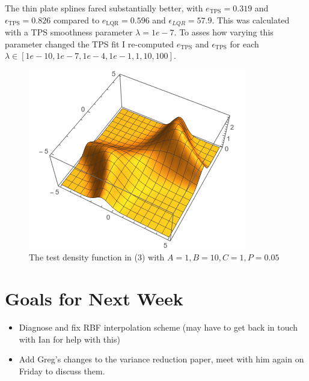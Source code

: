 \documentclass[12pt,a4paper]{article}
\begin{document}
The thin plate splines fared substantially better, with $e_{\text{TPS}} = 0.319$ and $\epsilon_{\text{TPS}} = 0.826$ compared to $e_{\text{LQR}} = 0.596$ and $\epsilon_{LQR} = 57.9$.  This was calculated with a TPS smoothness parameter $\lambda = 1e-7$.  To asses how varying this parameter changed the TPS fit I re-computed $e_{\text{TPS}}$ and $\epsilon_{\text{TPS}}$ for each $\lambda \in [1e-10, 1e-7,1e-4, 1e-1, 1, 10, 100]$.

\begin{figure}
\centering
\includegraphics[scale=.6]{./Figs/test_dense.png}
\caption{The test density function in (3) with $A = 1, B =10, C = 1, P = 0.05$}
\end{figure}

\section{Goals for Next Week}
\begin{itemize}
\item Diagnose and fix RBF interpolation scheme (may have to get back in touch with Ian for help with this)
\item Add Greg's changes to the variance reduction paper, meet with him again on Friday to discuss them.
\end{itemize}
\end{document}
